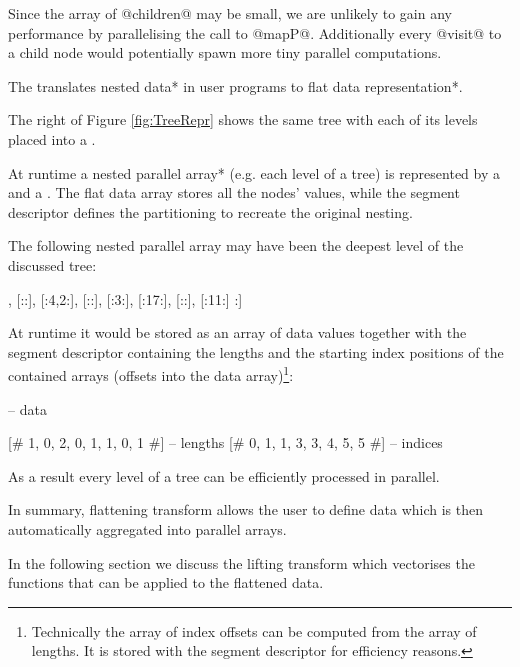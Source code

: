 \documentclass[preamble.tex]{subfiles}
\begin{document}
Since the array of @children@ may be small, we are unlikely to gain any performance by parallelising the call to @mapP@. Additionally every @visit@ to a child node would potentially spawn more tiny parallel computations. 

\begin{bluebox}
The  translates \*nested data* in user programs to \*flat data representation*.
\end{bluebox}

The right of Figure \ref{fig:TreeRepr} shows the same tree with each of its levels placed into a .

At runtime a \*nested parallel array* (e.g. each level of a tree) is represented by a  and a \isegd{}. The flat data array stores all the nodes' values, while the segment descriptor defines the partitioning to recreate the original nesting.

The following nested parallel array may have been the deepest level of the discussed tree:

\begin{hscode}
[: [:5:], [::], [:4,2:], [::], [:3:], [:17:], [::], [:11:] :]
\end{hscode}

At runtime it would be stored as an array of data values together with the segment descriptor containing the lengths and the starting index positions of the contained arrays (offsets into the data array)\footnote{Technically the array of index offsets can be computed from the array of lengths. It is stored with the segment descriptor for efficiency reasons.}:

\begin{hscode}
[# 5, 4, 2, 3, 17, 11 #]       -- data

[# 1, 0, 2, 0, 1, 1, 0, 1 #]   -- lengths
[# 0, 1, 1, 3, 3, 4, 5, 5 #]   -- indices
\end{hscode}

As a result every level of a tree can be efficiently processed in parallel.

In summary, flattening transform allows the user to define data which is then automatically aggregated into parallel arrays.

In the following section we discuss the lifting transform which vectorises the functions that can be applied to the flattened data.
\end{document}
